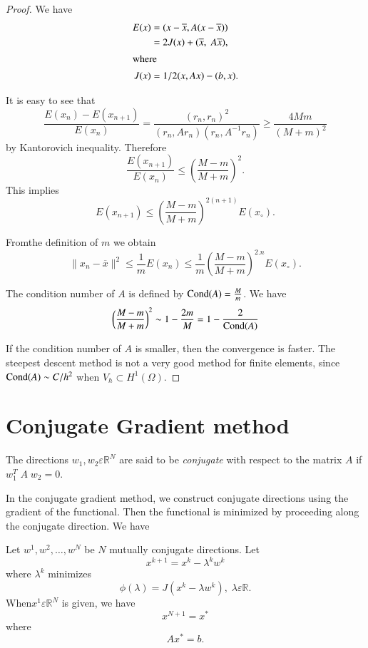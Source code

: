 \begin{proof}
We have 
\begin{align*}
E(x) &= (x-\overline{x}, A(x-\overline{x}))\\
&= 2J(x)+(\overline{x},\;A\overline{x}),\\
\intertext{where} 
J(x) &= 1/2 (x, Ax)-(b, x).
\end{align*}

It is easy to see that 
$$
\dfrac{E(x_n)-E(x_{n+1})}{E(x_n)}=\dfrac{(r_n, r_n)^2}{(r_n, Ar_n)(r_n,
A^{-1}r_n)}\geq\dfrac{4Mm}{(M+m)^2}
$$
by Kantorovich inequality. Therefore
$$
\dfrac{E(x_{n+1})}{E(x_n)}\leq\left(\dfrac{M-m}{M+m}\right)^2.
$$
This implies 
$$
E(x_{n+1})\leq\left(\dfrac{M-m}{M+m}\right)^{2(n+1)}E(x_\circ).
$$

From\pageoriginale the definition of $m$ we obtain
$$
\parallel x_n-\overline{x}\parallel^2\leq\frac{1}{m}E(x_n)\leq\frac{1}
{m}\left(\frac{M-m}{M+m}\right)^{2.n}E(x_\circ).
$$

The condition number of $A$ is defined by $\operatorname{Cond} (A)=\frac{M}{m}$. We
have 
$$
\left(\frac{M-m}{M+m}\right)^2\sim 1-\frac{2m}{M}=1- \frac{2}
{\operatorname{Cond} (A)}
$$

If the condition number of $A$ is smaller, then the convergence is
faster. The steepest descent method is not a very good method for
finite elements, since $\operatorname{Cond} (A)\sim C/h^2$ when $V_h\subset
H^1(\Omega)$. 
\end{proof}

\section{Conjugate Gradient method}\label{chap4:ssec4.3}
\begin{def*}\label{chap4:def}
The directions $w_1, w_2\varepsilon\mathbb{R}^N$ are said to be
\emph{conjugate} with respect to the matrix $A$ if $w_1^T\;A\;w_2=0$. 

In the conjugate gradient method, we construct conjugate directions
using the gradient of the functional. Then the functional is minimized
by proceeding along the conjugate direction. We have 
\end{def*}

\begin{THM}\label{chap4:THM2}
Let $w^1, w^2,\ldots,w^N$ be $N$ mutually conjugate directions. Let
$$
x^{k+1}=x^k-\lambda^k w^k
$$
where $\lambda^k$ minimizes
$$
\phi(\lambda)=J(x^k-\lambda w^k), \; \lambda\varepsilon\mathbb{R}.
$$
When\pageoriginale $x^1\varepsilon \mathbb{R}^N$ is given, we have 
$$
x^{N+1}=x^*
$$
where
$$
Ax^*=b.
$$
\end{THM}

